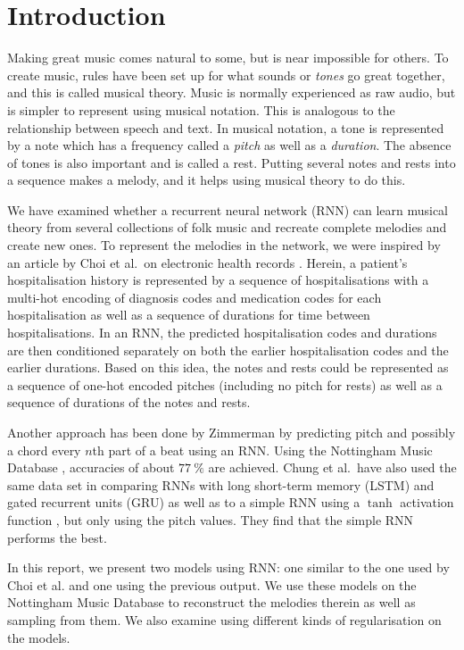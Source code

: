 \section{Introduction}
\label{sec:introduction}

Making great music comes natural to some, but is near impossible for others.
To create music, rules have been set up for what sounds or \emph{tones} go great together, and this is called musical theory.
Music is normally experienced as raw audio, but is simpler to represent using musical notation.
This is analogous to the relationship between speech and text.
In musical notation, a tone is represented by a note which has a frequency called a \emph{pitch} as well as a \emph{duration}.
The absence of tones is also important and is called a rest.
Putting several notes and rests into a sequence makes a melody, and it helps using musical theory to do this.

We have examined whether a recurrent neural network (RNN) can learn musical theory from several collections of folk music and recreate complete melodies and create new ones.
To represent the melodies in the network, we were inspired by an article by Choi et al.\ on electronic health records \cite{Choi2015}. Herein, a patient's hospitalisation history is represented by a sequence of hospitalisations with a multi-hot encoding of diagnosis codes and medication codes for each hospitalisation as well as a sequence of durations for time between hospitalisations.
In an RNN, the predicted hospitalisation codes and durations are then conditioned separately on both the earlier hospitalisation codes and the earlier durations.
Based on this idea, the notes and rests could be represented as a sequence of one-hot encoded pitches (including no pitch for rests) as well as a sequence of durations of the notes and rests.

Another approach has been done by Zimmerman \cite{Zimmerman2016} by predicting pitch and possibly a chord every $n$th part of a beat using an RNN.
Using the Nottingham Music Database \cite{NMD}, accuracies of about $\SI{77}{\%}$ are achieved.
Chung et al.\ have also used the same data set in comparing RNNs with long short-term memory (LSTM) and gated recurrent units (GRU) as well as to a simple RNN using a $\tanh$ activation function \cite{Chung2014}, but only using the pitch values.
They find that the simple RNN performs the best.

In this report, we present two models using RNN: one similar to the one used by Choi et al. \cite{Choi2015} and one using the previous output.
We use these models on the Nottingham Music Database to reconstruct the melodies therein as well as sampling from them.
We also examine using different kinds of regularisation on the models.
